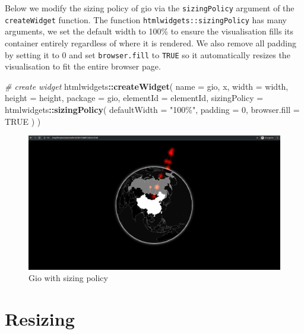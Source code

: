 \documentclass[
]{krantz}
\makeatletter
\newenvironment{Shaded}{\begin{snugshade}}{\end{snugshade}}
\newcommand{\CommentTok}[1]{\textcolor[rgb]{0.37,0.37,0.37}{\textit{#1}}}
\newcommand{\DataTypeTok}[1]{\textcolor[rgb]{0.27,0.27,0.27}{#1}}
\newcommand{\DecValTok}[1]{\textcolor[rgb]{0.06,0.06,0.06}{#1}}
\newcommand{\KeywordTok}[1]{\textcolor[rgb]{0.27,0.27,0.27}{\textbf{#1}}}
\newcommand{\NormalTok}[1]{#1}
\newcommand{\OperatorTok}[1]{\textcolor[rgb]{0.43,0.43,0.43}{\textbf{#1}}}
\newcommand{\OtherTok}[1]{\textcolor[rgb]{0.37,0.37,0.37}{#1}}
\newcommand{\StringTok}[1]{\textcolor[rgb]{0.5,0.5,0.5}{#1}}
\newenvironment{kframe}{%
\medskip{}
\setlength{\fboxsep}{.8em}
 \def\at@end@of@kframe{}%
 \ifinner\ifhmode%
  \def\at@end@of@kframe{\end{minipage}}%
  \begin{minipage}{\columnwidth}%
 \fi\fi%
 \def\FrameCommand##1{\hskip\@totalleftmargin \hskip-\fboxsep
 \colorbox{shadecolor}{##1}\hskip-\fboxsep
     \hskip-\linewidth \hskip-\@totalleftmargin \hskip\columnwidth}%
 \MakeFramed {\advance\hsize-\width
   \@totalleftmargin\z@ \linewidth\hsize
   \@setminipage}}%
 {\par\unskip\endMakeFramed%
 \at@end@of@kframe}
\renewenvironment{Shaded}{\begin{kframe}}{\end{kframe}}
\makeatother
\begin{document}
Below we modify the sizing policy of gio via the \texttt{sizingPolicy} argument of the \texttt{createWidget} function. The function \texttt{htmlwidgets::sizingPolicy} has many arguments, we set the default width to 100\% to ensure the visualisation fills its container entirely regardless of where it is rendered. We also remove all padding by setting it to 0 and set \texttt{browser.fill} to \texttt{TRUE} so it automatically resizes the visualisation to fit the entire browser page.

\begin{Shaded}
\begin{Highlighting}[]
\CommentTok{\# create widget}
\NormalTok{htmlwidgets}\OperatorTok{::}\KeywordTok{createWidget}\NormalTok{(}
  \DataTypeTok{name =} \StringTok{\textquotesingle{}gio\textquotesingle{}}\NormalTok{,}
\NormalTok{  x,}
  \DataTypeTok{width =}\NormalTok{ width,}
  \DataTypeTok{height =}\NormalTok{ height,}
  \DataTypeTok{package =} \StringTok{\textquotesingle{}gio\textquotesingle{}}\NormalTok{,}
  \DataTypeTok{elementId =}\NormalTok{ elementId,}
  \DataTypeTok{sizingPolicy =}\NormalTok{ htmlwidgets}\OperatorTok{::}\KeywordTok{sizingPolicy}\NormalTok{(}
    \DataTypeTok{defaultWidth =} \StringTok{"100\%"}\NormalTok{,}
    \DataTypeTok{padding =} \DecValTok{0}\NormalTok{,}
    \DataTypeTok{browser.fill =} \OtherTok{TRUE}
\NormalTok{  )}
\NormalTok{)}
\end{Highlighting}
\end{Shaded}

\begin{figure}
\centering
\includegraphics{images/gio-fit.png}
\caption{Gio with sizing policy}
\end{figure}

\hypertarget{resizing}{%
\section{Resizing}\label{resizing}}
\end{document}
